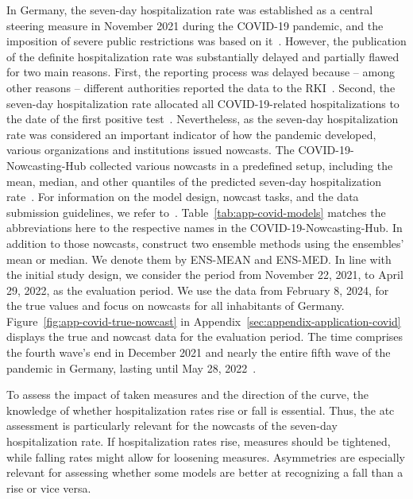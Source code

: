 \documentclass[pdflatex]{sn-jnl}
\theoremstyle{plain}%
\theoremstyle{definition}
\begin{document}
In Germany, the seven-day hospitalization rate was established as a central steering measure in November 2021 during the COVID-19 pandemic, and the imposition of severe public restrictions was based on it~\citep{RobertKochInstitute2021}.
However, the publication of the definite hospitalization rate was substantially delayed and partially flawed for two main reasons.
First, the reporting process was delayed because – among other reasons – different authorities reported the data to the RKI~\citep{RobertKochInstitute2024}.
Second, the seven-day hospitalization rate allocated all COVID-19-related hospitalizations to the date of the first positive test~\parencite[for a detailed description, see][]{Wolffram2023}.
Nevertheless, as the seven-day hospitalization rate was considered an important indicator of how the pandemic developed, various organizations and institutions issued nowcasts.
The COVID-19-Nowcasting-Hub collected various nowcasts in a predefined setup, including the mean, median, and other quantiles of the predicted seven-day hospitalization rate~\citep{ChairOfEconometricsAndStatisticsAtKarlsruheInstituteOfTechnology2024}.
For information on the model design, nowcast tasks, and the data submission guidelines, we refer to~\citet{Wolffram2023}.
Table~\ref{tab:app-covid-models} matches the abbreviations here to the respective names in the COVID-19-Nowcasting-Hub.
In addition to those nowcasts, \citet{Wolffram2023} construct two ensemble methods using the ensembles' mean or median.
We denote them by ENS-MEAN and ENS-MED.
In line with the initial study design, we consider the period from November 22, 2021, to April 29, 2022, as the evaluation period.
We use the data from February 8, 2024, for the true values and focus on nowcasts for all inhabitants of Germany.
Figure~\ref{fig:app-covid-true-nowcast} in Appendix~\ref{sec:appendix-application-covid} displays the true and nowcast data for the evaluation period.
The time comprises the fourth wave's end in December 2021 and nearly the entire fifth wave of the pandemic in Germany, lasting until May 28, 2022~\citep{Tolksdorf2022}.

To assess the impact of taken measures and the direction of the curve, the knowledge of whether hospitalization rates rise or fall is essential.
Thus, the \ac{atc} assessment is particularly relevant for the nowcasts of the seven-day hospitalization rate.
If hospitalization rates rise, measures should be tightened, while falling rates might allow for loosening measures.
Asymmetries are especially relevant for assessing whether some models are better at recognizing a fall than a rise or vice versa.
\end{document}
